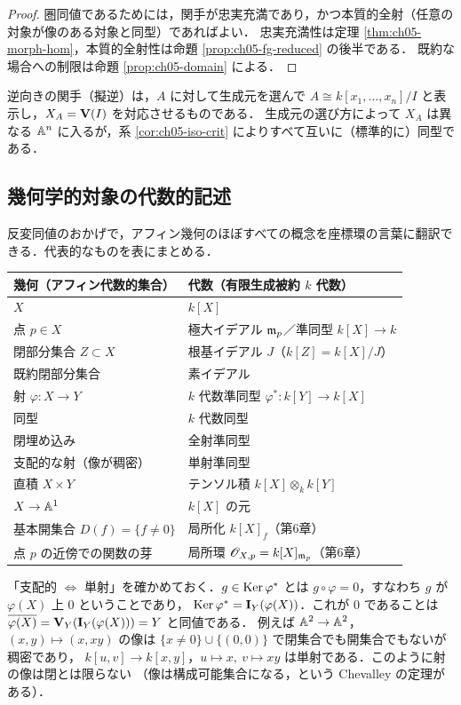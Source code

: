 \begin{proof}
圏同値であるためには，関手が忠実充満であり，かつ本質的全射（任意の対象が像のある対象と同型）であればよい．
忠実充満性は定理 \ref{thm:ch05-morph-hom}，本質的全射性は命題 \ref{prop:ch05-fg-reduced} の後半である．
既約な場合への制限は命題 \ref{prop:ch05-domain} による．
\end{proof}

逆向きの関手（擬逆）は，$A$ に対して生成元を選んで $A\cong k[x_1,\dots,x_n]/I$ と表示し，$X_A=\mathbf{V}(I)$ を対応させるものである．
生成元の選び方によって $X_A$ は異なる $\mathbb{A}^n$ に入るが，系 \ref{cor:ch05-iso-crit} によりすべて互いに（標準的に）同型である．

\subsection{幾何学的対象の代数的記述}

反変同値のおかげで，アフィン幾何のほぼすべての概念を座標環の言葉に翻訳できる．代表的なものを表にまとめる．

\begin{center}
\renewcommand{\arraystretch}{1.35}
\begin{tabular}{l|l}
幾何（アフィン代数的集合） & 代数（有限生成被約 $k$ 代数）\\ \hline
$X$ & $k[X]$\\
点 $p\in X$ & 極大イデアル $\mathfrak{m}_p$／準同型 $k[X]\to k$\\
閉部分集合 $Z\subset X$ & 根基イデアル $J$（$k[Z]=k[X]/J$）\\
既約閉部分集合 & 素イデアル\\
射 $\varphi:X\to Y$ & $k$ 代数準同型 $\varphi^*:k[Y]\to k[X]$\\
同型 & $k$ 代数同型\\
閉埋め込み & 全射準同型\\
支配的な射（像が稠密） & 単射準同型\\
直積 $X\times Y$ & テンソル積 $k[X]\otimes_k k[Y]$\\
$X\to\mathbb{A}^1$ & $k[X]$ の元\\
基本開集合 $D(f)=\{f\neq0\}$ & 局所化 $k[X]_f$（第6章）\\
点 $p$ の近傍での関数の芽 & 局所環 $\mathscr{O}_{X,p}=k[X]_{\mathfrak{m}_p}$（第6章）
\end{tabular}
\end{center}

「支配的 $\iff$ 単射」を確かめておく．$g\in\operatorname{Ker}\varphi^*$ とは $g\circ\varphi=0$，すなわち $g$ が $\varphi(X)$ 上 $0$ ということであり，
$\operatorname{Ker}\varphi^*=\mathbf{I}_Y(\varphi(X))$．これが $0$ であることは $\overline{\varphi(X)}=\mathbf{V}_Y(\mathbf{I}_Y(\varphi(X)))=Y$ と同値である．
例えば $\mathbb{A}^2\to\mathbb{A}^2$，$(x,y)\mapsto(x,xy)$ の像は $\{x\neq 0\}\cup\{(0,0)\}$ で閉集合でも開集合でもないが稠密であり，
$k[u,v]\to k[x,y]$，$u\mapsto x,\ v\mapsto xy$ は単射である．このように射の像は閉とは限らない
（像は構成可能集合になる，という Chevalley の定理がある）．

